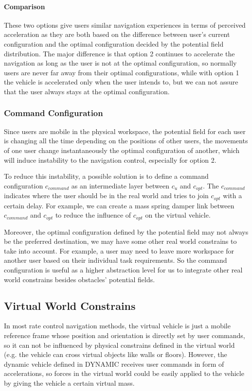 \paragraph{Comparison}
These two options give users similar navigation experiences in terms of perceived acceleration as they are both based on the difference between user's current configuration and the optimal configuration decided by the potential field distribution. The major difference is that option 2 continues to accelerate the navigation as long as the user is not at the optimal configuration, so normally users are never far away from their optimal configurations, while with option 1 the vehicle is accelerated only when the user intends to, but we can not assure that the user always stays at the optimal configuration.

\subsubsection{Command Configuration}
Since users are mobile in the physical workspace, the potential field for each user is changing all the time depending on the positions of other users, the movements of one user change instantaneously the optimal configuration of another, which will induce instability to the navigation control, especially for option 2.

To reduce this instability, a possible solution is to define a command configuration $c_{command}$ as an intermediate layer between $c_{u}$ and $c_{opt}$. The $c_{command}$ indicates where the user should be in the real world and tries to join $c_{opt}$ with a certain delay. For example, we can create a mass spring damper link between $c_{command}$ and $c_{opt}$ to reduce the influence of $c_{opt}$ on the virtual vehicle.

Moreover, the optimal configuration defined by the potential field may not always be the preferred destination, we may have some other real world constrains to take into account. For example, a user may need to leave more workspace for another user based on their individual task requirements. So the command configuration is useful as a higher abstraction level for us to integrate other real world constrains besides obstacles' potential fields. 


\subsection{Virtual World Constrains}
In most rate control navigation methods, the virtual vehicle is just a mobile reference frame whose position and orientation is directly set by user commands, so it can not be influenced by physical constrains defined in the virtual world (e.g. the vehicle can cross virtual objects like walls or floors). However, the dynamic vehicle defined in DYNAMIC receives user commands in form of accelerations, so forces in the virtual world could be easily applied to the vehicle by giving the vehicle a certain virtual mass.

